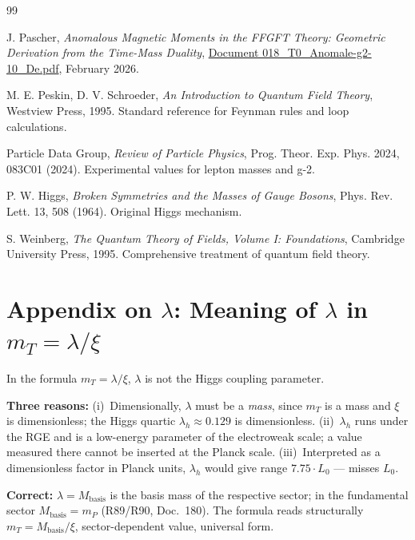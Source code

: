 	\begin{thebibliography}{99}
		
		J. Pascher,
		\textit{Anomalous Magnetic Moments in the FFGFT Theory: Geometric Derivation from the Time-Mass Duality},
		\href{https://github.com/jpascher/T0-Time-Mass-Duality/blob/main/2/pdf/018_T0_Anomale-g2-10_De.pdf}{Document 018\_T0\_Anomale-g2-10\_De.pdf},
		February 2026.
		
		M. E. Peskin, D. V. Schroeder,
		\textit{An Introduction to Quantum Field Theory},
		Westview Press, 1995.
		Standard reference for Feynman rules and loop calculations.
		
		Particle Data Group,
		\textit{Review of Particle Physics},
		Prog. Theor. Exp. Phys. 2024, 083C01 (2024).
		Experimental values for lepton masses and g-2.
		
		P. W. Higgs,
		\textit{Broken Symmetries and the Masses of Gauge Bosons},
		Phys. Rev. Lett. 13, 508 (1964).
		Original Higgs mechanism.
		
		S. Weinberg,
		\textit{The Quantum Theory of Fields, Volume I: Foundations},
		Cambridge University Press, 1995.
		Comprehensive treatment of quantum field theory.
		
	\end{thebibliography}

\section*{Appendix on $\lambda$: Meaning of $\lambda$ in $m_T = \lambda/\xi$}

In the formula $m_T = \lambda/\xi$, $\lambda$ is not the Higgs coupling parameter.

\textbf{Three reasons:}
(i)~Dimensionally, $\lambda$ must be a \emph{mass}, since $m_T$ is a mass
and $\xi$ is dimensionless; the Higgs quartic $\lambda_h \approx 0.129$
is dimensionless.
(ii)~$\lambda_h$ runs under the RGE and is a low-energy parameter of the
electroweak scale; a value measured there cannot be inserted at the Planck scale.
(iii)~Interpreted as a dimensionless factor in Planck units, $\lambda_h$
would give range $7.75\cdot L_0$ --- misses $L_0$.

\textbf{Correct:} $\lambda = M_\text{basis}$ is the basis mass of the respective
sector; in the fundamental sector $M_\text{basis} = m_P$ (R89/R90, Doc.~180).
The formula reads structurally $m_T = M_\text{basis}/\xi$, sector-dependent
value, universal form.
